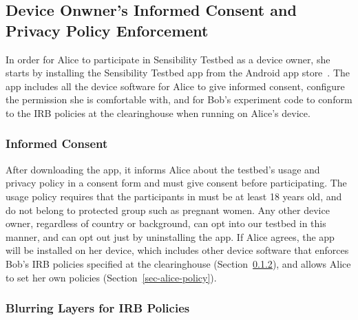 
\subsection{Device Onwner's Informed Consent and Privacy Policy 
Enforcement}\label{sec-repy}

In order for Alice to participate in Sensibility Testbed as a device owner,
she starts by installing the Sensibility Testbed app from 
the Android app store~\cite{sensibility-app}. The app includes all the device
software for Alice to give informed consent, configure the permission she
is comfortable with, and for Bob's experiment code to conform to the 
IRB policies at the clearinghouse when running on Alice's device.

\subsubsection{Informed Consent}\label{subsec:informed-consent}

After downloading the app, it informs Alice about the testbed's usage and 
privacy policy in a consent form and must give consent before participating.
The usage policy requires that the participants in \sysname must be at least 
18 years old, and do not belong to protected group such as pregnant women.
Any other device owner, regardless of country or background, can 
opt into our testbed in this manner, and can opt out just by uninstalling the app. 
If Alice agrees, the app will be installed on her device, which includes other
device software that enforces Bob's IRB policies specified at the 
clearinghouse (Section~\ref{sec-bob-policy}), and allows Alice to set her 
own policies (Section~\ref{sec-alice-policy}).


\subsubsection{Blurring Layers for IRB Policies}\label{sec-bob-policy}

